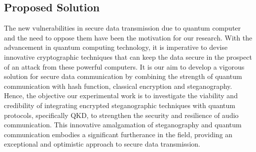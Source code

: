 \documentclass[a4paper]{cas-sc}
\begin{document}
\subsection{Proposed Solution}
The new vulnerabilities in secure data transmission due to quantum computer and the need to oppose them have been the motivation for our research. With the advancement in quantum computing technology, it is imperative to devise innovative cryptographic techniques that can keep the data secure in the prospect of an attack from these powerful computers. It is our aim to develop a vigorous solution for secure data communication by combining the strength of quantum communication with hash function, classical encryption and steganography. Hence, the objective our experimental work is to investigate the viability and credibility of integrating encrypted steganographic techniques with quantum protocols, specifically QKD, to strengthen the security and resilience of audio communication. This innovative amalgamation of steganography and quantum communication embodies a significant furtherance in the field, providing an exceptional and optimistic approach to secure data transmission.
\end{document}
